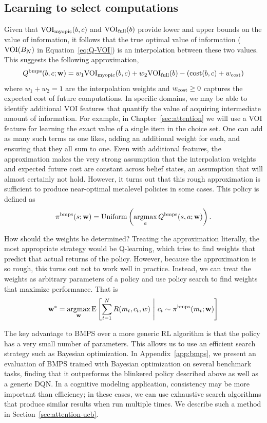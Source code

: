 \subsection{Learning to select computations}

Given that $\text{VOI}_\text{myopic}(b,c)$ and $\text{VOI}_\text{full}(b)$ provide lower and upper bounds on the value of information, it follows that the true optimal value of information ($\text{VOI}(B_N)$ in Equation~\ref{eq:Q-VOI}) is an interpolation between these two values. This suggests the following approximation,
\begin{equation}\label{eq:bmpsQ}
  Q^{\mathrm{bmps}}(b, c; \mathbf{w}) = w_1 \text{VOI}_\text{myopic}(b,c) + w_2 \text{VOI}_\text{full}(b) - (\text{cost}(b, c) + w_{\text{cost}})
\end{equation}
where $w_1 + w_2 = 1$ are the interpolation weights and $w_{\text{cost}} \geq 0$ captures the expected cost of future computations. In specific domains, we may be able to identify additional VOI features that quantify the value of acquiring intermediate amount of information. For example, in Chapter~\ref{sec:attention} we will use a VOI feature for learning the exact value of a single item in the choice set. One can add as many such terms as one likes, adding an additional weight for each, and ensuring that they all sum to one. Even with additional features, the approximation makes the very strong assumption that the interpolation weights and expected future cost are constant across belief states, an assumption that will almost certainly not hold. However, it turns out that this rough approximation is sufficient to produce near-optimal metalevel policies in some cases. This policy is defined as
\begin{equation}
  \pi^{\mathrm{bmps}}(s; \mathbf{w}) = \mathrm{Uniform}\left(\operatorname*{argmax}_a Q^{\mathrm{bmps}}(s, a; \mathbf{w})\right).
\end{equation}

How should the weights be determined? Treating the approximation literally, the most appropriate strategy would be Q-learning, which tries to find weights that predict that actual returns of the policy. However, because the approximation is so rough, this turns out not to work well in practice. Instead, we can treat the weights as arbitrary parameters of a policy and use policy search to find weights that maximize performance. That is
\begin{equation}
  \mathbf{w}^* = \operatorname*{argmax}_{\mathbf{w}} \operatorname*{E} \left[ 
    \sum_{t=1}^{N} R(m_t, c_t, w)
   \ \middle\vert\ 
    c_t \sim \pi^{\mathrm{bmps}}(m_t; \mathbf{w})
   \right]
\end{equation}

The key advantage to BMPS over a more generic RL algorithm is that the policy has a very small number of parameters. This allows us to use an efficient search strategy such as Bayesian optimization. In Appendix~\ref{app:bmps}, we present an evaluation of BMPS trained with Bayesian optimization on several benchmark tasks, finding that it outperforms the blinkered policy described above as well as a generic DQN. In a cognitive modeling application, consistency may be more important than efficiency; in these cases, we can use exhaustive search algorithms that produce similar results when run multiple times. We describe such a method in Section~\ref{sec:attention-ucb}.
